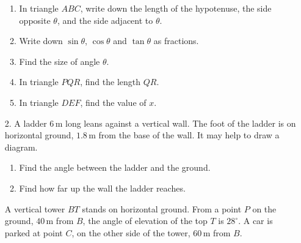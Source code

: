 \documentclass[12pt, twoside]{article}
\begin{document}
\begin{enumerate}[itemsep=0.15cm]
\begin{enumerate}[itemsep=0.1cm]
  \item In triangle $ABC$, write down the length of the hypotenuse, the
  side opposite $\theta$, and the side adjacent to $\theta$.
  \item Write down $\sin\theta$, $\cos\theta$ and $\tan\theta$ as fractions.
  \item Find the size of angle $\theta$.
  \item In triangle $PQR$, find the length $QR$.
  \item In triangle $DEF$, find the value of $x$.
\end{enumerate}


\newpage

\item[2.]
A ladder $6\,\text{m}$ long leans against a vertical wall. The foot of the
ladder is on horizontal ground, $1.8\,\text{m}$ from the base of the wall.
It may help to draw a diagram.

\begin{enumerate}[itemsep=0.1cm]
  \item Find the angle between the ladder and the ground.
  \item Find how far up the wall the ladder reaches.
\end{enumerate}

A vertical tower $BT$ stands on horizontal ground. From a point $P$ on the
ground, $40\,\text{m}$ from $B$, the angle of elevation of the top $T$ is
$28^\circ$. A car is parked at point $C$, on the other side of the tower,
$60\,\text{m}$ from $B$.

\begin{center}
\end{center}


\end{enumerate}
\end{document}
